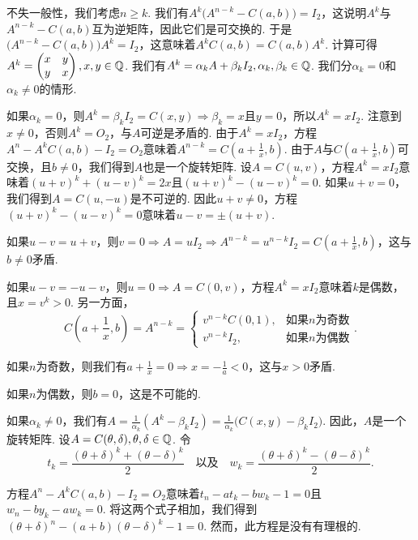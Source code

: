 \begin{solution}
  不失一般性，我们考虑$n\ge k$. 我们有$A^k\big(A^{n-k}-C(a,b)\big)=I_2$，这说明$A^k$与$A^{n-k}-C(a,b)$互为逆矩阵，因此它们是可交换的. 于是$\big(A^ {n-k}-C(a,b)\big)A^k=I_2$，这意味着$A^kC(a,b)=C(a,b)A^k$. 计算可得$A^k=\begin{pmatrix}
    x & y \\
    y & x
  \end{pmatrix},x,y\in\mathbb Q$. 我们有$A^k=\alpha_kA+\beta_kI_2,\alpha_k,\beta_k\in\mathbb Q$. 我们分$\alpha_k=0$和$\alpha_k\ne0$的情形.

  如果$\alpha_k=0$，则$A^k=\beta_kI_2=C(x,y)\Rightarrow \beta_k=x$且$y=0$，所以$A^k=xI_2$. 注意到$x\ne0$，否则$A^k=O_2$，与$A$可逆是矛盾的. 由于$A^k=xI_2$，方程$A^n-A^kC(a,b)-I_2=O_2$意味着$A^{n-k}=C\left(a+\frac1x,b\right)$. 由于$A$与$C\left(a+\frac1x,b\right)$可交换，且$b\ne0$，我们得到$A$也是一个旋转矩阵. 设$A=C(u,v)$，方程$A^k=xI_2$意味着$(u+v)^k+(u-v)^k=2x$且$(u+v)^k-(u-v)^k=0$. 如果$u+v=0$，我们得到$A=C(u,-u)$是不可逆的. 因此$u+v\ne0$，方程$(u+v)^k-(u-v)^k=0$意味着$u-v=\pm(u+v)$.

  如果$u-v=u+v$，则$v=0\Rightarrow A=uI_2\Rightarrow A^{n-k}=u^{n-k}I_2=C\left(a+\frac1x,b\right)$，这与$b\ne0$矛盾.

  如果$u-v=-u-v$，则$u=0\Rightarrow A=C(0,v)$，方程$A^k=xI_2$意味着$k$是偶数，且$x=v^k>0$. 另一方面，
  \[
    C\left( a + \frac1x ,b \right) = A^{n-k} =
    \begin{cases}
      v^{n-k}C(0,1), & \text{如果$n$为奇数} \\
      v^{n-k}I_2, & \text{如果$n$为偶数}
    \end{cases}.
  \]

  如果$n$为奇数，则我们有$a+\frac1x=0\Rightarrow x=-\frac1a<0$，这与$x>0$矛盾.

  如果$n$为偶数，则$b=0$，这是不可能的.

  如果$\alpha_k\ne0$，我们有$A=\frac1{\alpha_k}(A^k-\beta_kI_2)=\frac1{\alpha_k}
  \big(C(x,y)-\beta_kI_2\big)$. 因此，$A$是一个旋转矩阵. 设$A=C(\theta,\delta),\theta,\delta\in\mathbb Q$. 令
  \[
    t_k = \frac{(\theta+\delta)^k+(\theta-\delta)^k}2\quad \text{以及}\quad w_k = \frac{(\theta+\delta)^k-(\theta-\delta)^k}2.
  \]

  方程$A^n-A^kC(a,b)-I_2=O_2$意味着$t_n-at_k-bw_k-1=0$且$w_n-by_k-aw_k=0$. 将这两个式子相加，我们得到$(\theta+\delta)^n-(a+b)(\theta-\delta)^k-1=0$. 然而，此方程是没有有理根的.
\end{solution}


